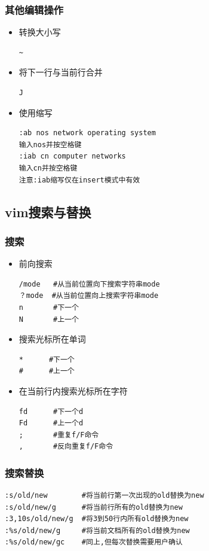 \documentclass[xcolor=svgnames,presentation]{beamer}
\begin{document}
\begin{frame}[fragile]
\frametitle{其他编辑操作}
\label{sec-4-4-8}
\begin{itemize}

\item 转换大小写\\
\label{sec-4-4-8-1}%
\begin{verbatim}
~
\end{verbatim}

\item 将下一行与当前行合并\\
\label{sec-4-4-8-2}%
\begin{verbatim}
J
\end{verbatim}

\item 使用缩写\\
\label{sec-4-4-8-3}%
\begin{verbatim}
:ab nos network operating system
输入nos并按空格键
:iab cn computer networks
输入cn并按空格键
注意:iab缩写仅在insert模式中有效
\end{verbatim}
\end{itemize} %
\end{frame}
\subsection{vim搜索与替换}
\label{sec-4-5}
\begin{frame}[fragile]
\frametitle{搜索}
\label{sec-4-5-1}
\begin{itemize}

\item 前向搜索\\
\label{sec-4-5-1-1}%
\begin{verbatim}
/mode   #从当前位置向下搜索字符串mode
？mode  #从当前位置向上搜索字符串mode
n       #下一个
N       #上一个
\end{verbatim}

\item 搜索光标所在单词\\
\label{sec-4-5-1-2}%
\begin{verbatim}
*      #下一个
#      #上一个
\end{verbatim}

\item 在当前行内搜索光标所在字符\\
\label{sec-4-5-1-3}%
\begin{verbatim}
fd      #下一个d
Fd      #上一个d
;       #重复f/F命令
,       #反向重复f/F命令
\end{verbatim}
\end{itemize} %
\end{frame}
\begin{frame}[fragile]
\frametitle{搜索替换}
\label{sec-4-5-2}
\label{sec-4-5-2-1}


\begin{verbatim}
:s/old/new        #将当前行第一次出现的old替换为new
:s/old/new/g      #将当前行所有的old替换为new
:3,10s/old/new/g  #将3到50行内所有old替换为new
:%s/old/new/g     #将当前文档所有的old替换为new
:%s/old/new/gc    #同上,但每次替换需要用户确认
\end{verbatim}
\end{frame}
\end{document}

